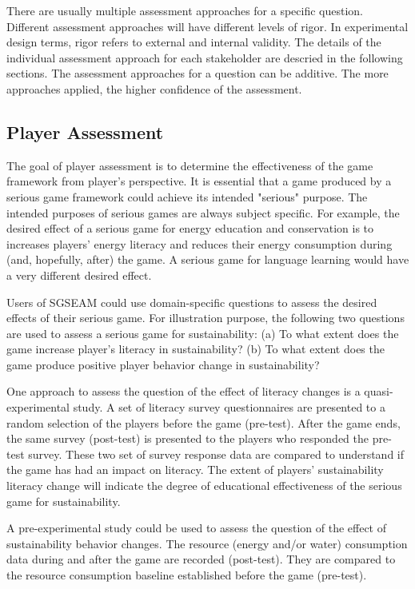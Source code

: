 There are usually multiple assessment approaches for a specific question. Different assessment
approaches will have different levels of rigor. In experimental design terms, rigor refers to
external and internal validity. The details of the individual assessment approach for each
stakeholder are descried in the following sections. The assessment approaches for a question
can be additive. The more approaches applied, the higher confidence of the assessment.

\subsection{Player Assessment}

The goal of player assessment is to determine the effectiveness of the game
framework from player's perspective. It is essential that a game produced by a serious game
framework could achieve its intended "serious" purpose. The intended purposes of serious games are
always subject specific. For example, the desired effect of a serious game for
energy education and conservation is to increases players' energy literacy and
reduces their energy consumption during (and, hopefully, after) the game. A serious game for
language learning would have a very different desired effect.

Users of SGSEAM could use domain-specific questions to assess the desired effects of their
serious game. For illustration purpose, the following two questions are used to assess a serious
game for sustainability: (a) To what extent does the game increase player's literacy in
sustainability? (b) To what extent does the game produce positive player behavior change in
sustainability?

One approach to assess the question of the effect of literacy changes is a quasi-experimental
study. A set of literacy survey questionnaires are presented to a random selection of the players
before the game (pre-test). After the game ends, the same survey (post-test) is presented to the
players who responded the pre-test survey. These two set of survey response data are compared to
understand if the game has had an impact on literacy. The extent of players' sustainability
literacy change will indicate the degree of educational effectiveness of the serious game for
sustainability.

A pre-experimental study could be used to assess the question of the effect of
sustainability behavior changes. The resource (energy and/or water) consumption data during and
after the game are recorded (post-test). They are compared to the resource consumption baseline
established before the game (pre-test).

